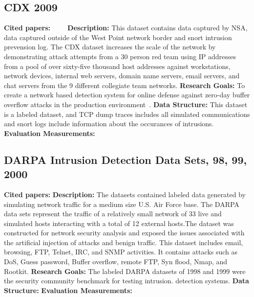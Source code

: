 \subsection{CDX 2009}
\textbf{Cited papers:} ~\cite{homoliak2013asnm} ~\cite{sangster2009toward}~\cite{chen2014human}\newline
\textbf{Description:} This dataset contains data captured by NSA, data captured outside of the West Point network border and snort intrusion prevension log. The CDX dataset increases the scale of the network by demonstrating attack attempts from a 30 person red team using IP addresses from a pool of over sixty-five thousand host addresses against workstations, network devices, internal web servers, domain name servers, email servers, and chat servers from the 9 different collegiate team networks.\newline
\textbf{Research Goals:} To create a network based detection system for online defense against zero-day buffer overflow attacks in the production environment~\cite{homoliak2013asnm}. \newline
\textbf{Data Structure:} This dataset is a labeled dataset, and TCP dump traces includes all simulated communications and snort logs include information about the occurances of intrusions. \newline
\textbf{Evaluation Measurements:} \newline
























\subsection{DARPA Intrusion Detection Data Sets, 98, 99, 2000}
\textbf{Cited papers:} \newline
\textbf{Description:} The datasets contained labeled data generated by simulating network traffic for a medium size U.S. Air Force base. The DARPA data sets represent the traffic of a relatively small network of 33 live and simulated hosts interacting with a total of 12 external hosts.The dataset was constructed for network security analysis and exposed the issues associated with the artificial injection of attacks and benign traffic. This dataset includes email, browsing, FTP, Telnet, IRC, and SNMP activities. It contains attacks such as DoS, Guess password, Buffer overflow, remote FTP, Syn flood, Nmap, and Rootkit.\newline
\textbf{Research Goals:} The labeled DARPA datasets of 1998 and 1999 were the security community benchmark for testing intrusion.
detection systems. \newline
\textbf{Data Structure:} \newline
\textbf{Evaluation Measurements:} \newline






